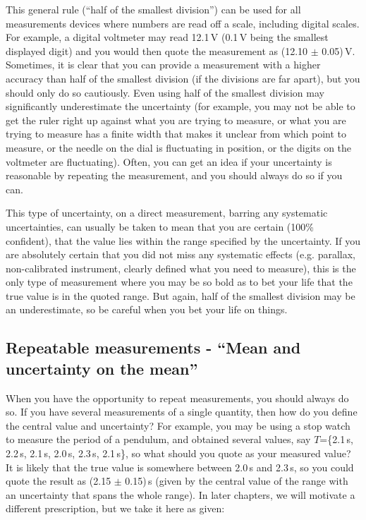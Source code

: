 
This general rule (``half of the smallest division'') can be used for all measurements devices where numbers are read off a scale, including digital scales. For example, a digital voltmeter may read 12.1\,V (0.1\,V being the smallest displayed digit) and you would then quote the measurement as (12.10 $\pm$ 0.05)\,V. Sometimes, it is clear that you can provide a measurement with a higher accuracy than half of the smallest division (if the divisions are far apart), but you should only do so cautiously. Even using half of the smallest division may significantly underestimate the uncertainty (for example, you may not be able to get the ruler right up against what you are trying to measure, or what you are trying to measure has a finite width that makes it unclear from which point to measure, or the needle on the dial is fluctuating in position, or the digits on the voltmeter are fluctuating). Often, you can get an idea if your uncertainty is reasonable by repeating the measurement, and you should always do so if you can. 

This type of uncertainty, on a direct measurement, barring any systematic uncertainties, can usually be taken to mean that you are certain (100\% confident), that the value lies within the range specified by the uncertainty. If you are absolutely certain that you did not miss any systematic effects (e.g. parallax, non-calibrated instrument, clearly defined what you need to measure), this is the only type of measurement where you may be so bold as to bet your life that the true value is in the quoted range. But again, half of the smallest division may be an underestimate, so be careful when you bet your life on things. 

\subsection{Repeatable measurements - ``Mean and uncertainty on the mean''}
When you have the opportunity to repeat measurements, you should always do so. If you have several measurements of a single quantity, then how do you define the central value and uncertainty? For example, you may be using a stop watch to measure the period of a pendulum, and obtained several values, say $T$=\{2.1\,s, 2.2\,s, 2.1\,s, 2.0\,s, 2.3\,s, 2.1\,s\}, so what should you quote as your measured value? It is likely that the true value is somewhere between 2.0\,s and 2.3\,s, so you could quote the result as (2.15 $\pm$ 0.15)\,s (given by the central value of the range with an uncertainty that spans the whole range). In later chapters, we will motivate a different prescription, but we take it here as given:

